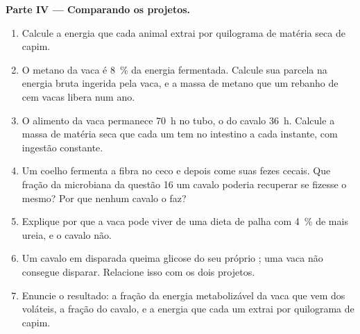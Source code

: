 \begin{problem}
\medskip
\noindent\textbf{Parte IV --- Comparando os projetos.}
\begin{enumerate}[resume]
  \item Calcule a energia que cada animal extrai por quilograma de
        matéria seca de capim.
  \item O metano da vaca é \qty{8}{\%} da energia fermentada. Calcule
        sua parcela na energia bruta ingerida pela vaca, e a massa de
        metano que um rebanho de cem vacas libera num ano.
  \item O alimento da vaca permanece \qty{70}{h} no tubo, o do cavalo
        \qty{36}{h}. Calcule a massa de matéria seca que cada um tem
        no intestino a cada instante, com ingestão constante.
  \item Um coelho fermenta a fibra no ceco e depois come suas fezes
        cecais. Que fração da  microbiana da questão 16 um
        cavalo poderia recuperar se fizesse o mesmo? Por que nenhum
        cavalo o faz?
  \item Explique por que a vaca pode viver de uma dieta de palha com
        \qty{4}{\%} de  mais ureia, e o cavalo não.
  \item Um cavalo em disparada queima glicose do seu próprio
        ; uma vaca não consegue disparar. Relacione isso com
        os dois projetos.
  \item Enuncie o resultado: a fração da energia metabolizável da vaca
        que vem dos  voláteis, a fração do cavalo, e a
        energia que cada um extrai por quilograma de capim.
\end{enumerate}
\end{problem}
